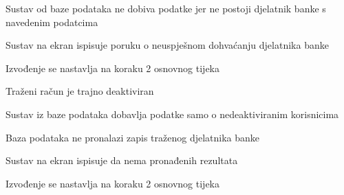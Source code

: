 \begin{packed_item}
\begin{packed_item}
							\item[3.1] Sustav od baze podataka ne dobiva podatke jer ne postoji djelatnik banke s navedenim podatcima
							\item[] \begin{packed_enum}
								\item Sustav na ekran ispisuje poruku o neuspješnom dohvaćanju djelatnika banke
								\item Izvođenje se nastavlja na koraku 2 osnovnog tijeka
							\end{packed_enum}
							\item[3.2] Traženi račun je trajno deaktiviran
							\item[] \begin{packed_enum}
								\item Sustav iz baze podataka dobavlja podatke samo o nedeaktiviranim korisnicima
								\item Baza podataka ne pronalazi zapis traženog djelatnika banke
								\item Sustav na ekran ispisuje da nema pronađenih rezultata
								\item Izvođenje se nastavlja na koraku 2 osnovnog tijeka
							\end{packed_enum}
							
						\end{packed_item}
						
					\end{packed_item}
					
